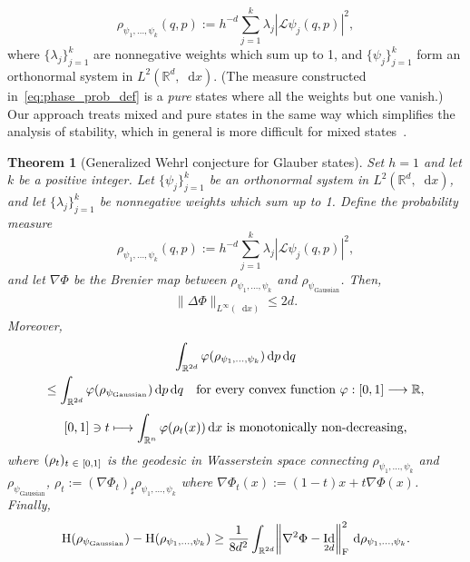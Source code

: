 \documentclass[10pt]{amsart}
\newtheorem{theo}{Theorem}[section]
\theoremstyle{definition}\newtheorem{defi}[theo]{Definition}\newtheorem{rema}[theo]{Remark}\newtheorem{exam}[theo]{Example}\newtheorem{exem}[theo]{Example}\newtheorem{nota}[theo]{Notation}
\newcommand{\R}{\mathbb R}
\DeclareMathOperator{\Id}{Id}
\newcommand{\Ent}{\mathrm H}
\newcommand{\dd}{n}
\newcommand{\prob}{\rho}
\newcommand*\diff{\mathop{}\!\mathrm{d}}
\newcommand{\cotrans}{\mathcal L}
\newcommand{\OT}{\Phi}
\newcommand{\wave}{\psi}
\newcommand{\waveg}{\psi_{\mathrm{Gaussian}}}
\newcommand{\cxfun}{\varphi}
\renewcommand*{\to}{\mathchoice{\longrightarrow}{\rightarrow}{\rightarrow}{\rightarrow}}
\let\oldmapsto\mapsto
\renewcommand*{\mapsto}{\mathchoice{\longmapsto}{\oldmapsto}{\oldmapsto}{\oldmapsto}}
\let\originalleft\left
\let\originalright\right
\renewcommand{\left}{\mathopen{}\mathclose\bgroup\originalleft}
\renewcommand{\right}{\aftergroup\egroup\originalright}
\let\oldin\in
\renewcommand{\in}{\mathchoice{\oldin}{\oldin}{\,\oldin\,}{\,\oldin\,}}
\begin{document}
\begin{equation}\label{eq:mixed}
\prob_{\wave_1,\ldots,\wave_k}(q,p):=h^{-d}\sum_{j=1}^k\lambda_j|\cotrans \wave_j(q,p)|^2,
\end{equation}
where $\{\lambda_j\}_{j=1}^k$ are nonnegative weights which sum up to 1, and $\{\wave_j\}_{j=1}^k$ form an orthonormal system in $L^2(\R^d,\diff x)$. (The measure constructed in~\eqref{eq:phase_prob_def} is a \emph{pure} states where all the weights but one vanish.) Our approach treats mixed and pure states in the same way which simplifies the analysis of stability, which in general is more difficult for mixed states~\cite{frank2023generalized}.


\begin{theo}[Generalized Wehrl conjecture for Glauber states]\label{thm:generalized_Wehrl_conjecture}
Set $h=1$ and let $k$ be a positive integer. Let $\{\wave_j\}_{j=1}^k$ be an orthonormal system in $L^2(\R^d,\diff x)$, and let $\{\lambda_j\}_{j=1}^k$ be nonnegative weights which sum up to 1. Define the probability measure
\[
\prob_{\wave_1,\ldots,\wave_k}(q,p):=h^{-d}\sum_{j=1}^k\lambda_j|\cotrans \wave_j(q,p)|^2,
\]
and let $\nabla\OT$ be the Brenier map between $\prob_{\wave_1,\ldots,\wave_k}$ and $\prob_{\waveg}$. Then,
\begin{align}\label{eq:infty_bound_Wehrl}
\|\Delta\OT\|_{L^{\infty}(\diff x)}\le 2d.
\end{align}
Moreover,
\begin{multline}\label{eq:majorization_Wehrl}
\int_{\R^{2d}} \cxfun(\prob_{\wave_1,\ldots,\wave_k})\diff p\diff q\\
\le \int_{\R^{2d}} \cxfun\left(\prob_{\waveg}\right)\diff p\diff q\quad\text{for every convex function }\varphi:[0,1] \to \R,
\end{multline}
\begin{equation}\label{eq:mono_geo_Wehrl}
[0,1]\ni t\mapsto \int_{\R^{\dd}}\cxfun(\prob_t(x))\diff x\textnormal{ is monotonically non-decreasing},
\end{equation}
where $(\prob_t)_{t\in [0,1]}$ is the geodesic in Wasserstein space connecting $\prob_{\wave_1,\ldots,\wave_k}$ and\linebreak $\prob_{\waveg}$, $\prob_t:=(\nabla\OT_t)_{\sharp}\prob_{\wave_1,\ldots,\wave_k}$ where $\nabla\OT_t(x):=(1-t)x+t\nabla\OT(x)$. Finally,
\begin{align}\label{eq:entropy_stability_Wehrl}
\Ent\left(\prob_{\waveg}\right)- \Ent\left(\prob_{\wave_1,\ldots,\wave_k}\right) \ge \frac{1}{8d^2}\int_{\R^{2d}}\left\|\nabla^2\OT-\Id_{2d}\right\|_{\text{F}}^2\,\diff \prob_{\wave_1,\ldots,\wave_k}.
\end{align}
\end{theo}
\end{document}
